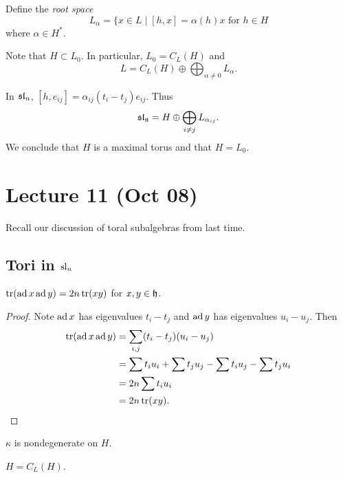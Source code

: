 \documentclass[twoside, 10pt]{article}
\begin{document}
    \begin{defn}
        Define the \textit{root space}
        \[ L_{\alpha} = \{x \in L \mid [h,x] = \alpha(h) x \text{ for $h \in H$}\]
        where $\alpha \in H^*$.
    \end{defn}

    Note that $H \subset L_0$. In particular, $L_0 = C_L(H)$ and
    \[ L = C_L(H) \oplus \bigoplus_{\alpha \neq 0} L_{\alpha}.\]

    \begin{exm}
        In $\mathfrak{sl}_n$, $[h,e_{ij}] = \alpha_{ij}(t_i-t_j)e_{ij}$. Thus
        \[ \mathfrak{sl_n} = H \oplus \bigoplus_{i \neq j} L_{\alpha_{ij}}.\]
        We conclude that $H$ is a maximal torus and that $H = L_0$.
    \end{exm}

    \section{Lecture 11 (Oct 08)}%
    \label{sec:lecture_11_oct_08_}

    Recall our discussion of toral subalgebras from last time.

    \subsection{Tori in $\mathrm{sl}_n$}%
    \label{sub:tori_in_sl_n_}

    \begin{prop}
        $\operatorname{tr}(\operatorname{ad} x \operatorname{ad} y) = 2n \operatorname{tr}(xy)$ for $x,y \in \mathfrak{h}$.
    \end{prop}

    \begin{proof}
        Note $\operatorname{ad} x$ has eigenvalues $t_i - t_j$ and $\operatorname{ad} y$ has eigenvalues $u_i - u_j$. Then 
        \begin{align*}
            \operatorname{tr}(\operatorname{ad} x \operatorname{ad} y) &= \sum_{i,j} (t_i-t_j)(u_i-u_j) \\
            &= \sum t_iu_i + \sum t_ju_j - \sum t_iu_j - \sum t_ju_i \\
            &= 2n \sum t_iu_i \\
            &= 2n \operatorname{tr}(xy).
        \end{align*}
    \end{proof}
    
    \begin{cor}
        $\kappa$ is nondegenerate on $H$.
    \end{cor}

    \begin{prop}
        $H = C_L(H)$. 
    \end{prop}
    
\end{document}

